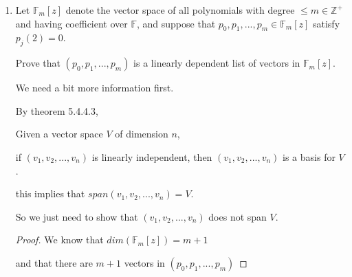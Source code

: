 \documentclass[12pt,letterpaper]{article}
\begin{document}
\begin{enumerate}
\begin{proof}
        Now, since we know that $v_1$ is a basis for $U_1$ and part of the basis for $V$,
        we know that $v_1 \neq 0$, so we must have:

        \begin{align*}
          (a_1 - b_1)v_1 &= 0 \\
          a_1 - b_1 &= 0 \\
          a_1 &= b_1 \\
        \end{align*}

        And so, there is only one unique way to create $v_1$.

        Through similar reasoning, we can show that each $v_i$ is unique.

        Thus, since each $v_i \in V$ can be uniquely represented as $v_1 + v_2 + ... + v_n$,
        where $v_1 \in U_i, v_2 \in U_2, ..., v_n \in U_n$,

        \[V = U_1 \oplus U_2 \oplus \cdots \oplus U_n\]

      \end{proof}

    \pagebreak

    \item
      Let $\mathbb{F}_m[z]$ denote the vector space of all polynomials with degree
      $\le m \in \mathbb{Z}^+$ and having coefficient over $\mathbb{F}$,
      and suppose that $p_0, p_1, ..., p_m \in \mathbb{F}_m[z]$ satisfy
      $p_j(2) = 0$.
      
      Prove that $(p_0, p_1, ..., p_m)$
      is a linearly dependent list of vectors in $\mathbb{F}_m[z]$.

      We need a bit more information first.

      By theorem 5.4.4.3,

      Given a vector space $V$ of dimension $n$,

      if $(v_1, v_2, ..., v_n)$ is linearly independent, 
      then $(v_1, v_2, ..., v_n)$ is a basis for $V$.

      this implies that $span(v_1, v_2, ..., v_n) = V$.

      So we just need to show that $(v_1, v_2, ..., v_n)$ does not span $V$.

      \begin{proof}

        We know that $dim(\mathbb{F}_m[z]) = m + 1$

        and that there are $m + 1$ vectors in $(p_0, p_1, ..., p_m)$


\end{proof}
\end{enumerate}
\end{document}

